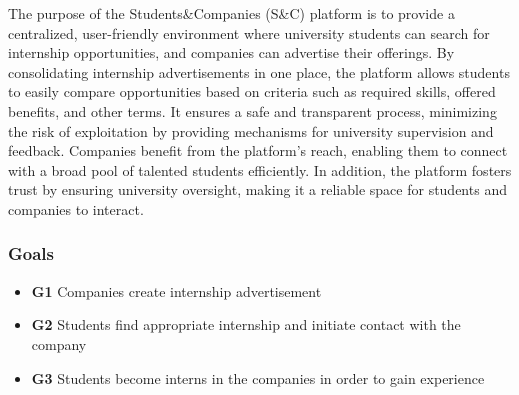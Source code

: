 The purpose of the Students\&Companies (S\&C) platform is to provide a centralized, user-friendly environment where university students can search for internship opportunities, and companies can advertise their offerings. By consolidating internship advertisements in one place, the platform allows students to easily compare opportunities based on criteria such as required skills, offered benefits, and other terms. It ensures a safe and transparent process, minimizing the risk of exploitation by providing mechanisms for university supervision and feedback. Companies benefit from the platform’s reach, enabling them to connect with a broad pool of talented students efficiently. In addition, the platform fosters trust by ensuring university oversight, making it a reliable space for students and companies to interact.

\subsubsection{Goals}
\begin{itemize}
    \item \textbf{G1} Companies create internship advertisement
    \item \textbf{G2} Students find appropriate internship and initiate contact with the company
    \item \textbf{G3} Students become interns in the companies in order to gain experience
    
\end{itemize}